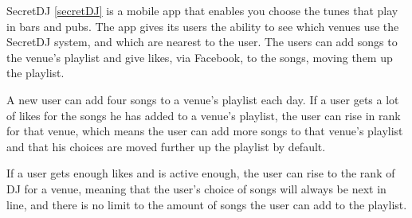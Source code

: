 SecretDJ \cref{secretDJ} is a mobile app that enables you choose the tunes that play in bars and pubs. The app gives its users the ability to see which venues use the SecretDJ system, and which are nearest to the user. The users can add songs to the venue's playlist and give likes, via Facebook, to the songs, moving them up the playlist.

A new user can add four songs to a venue's playlist each day. If a user gets a lot of likes for the songs he has added to a venue's playlist, the user can rise in rank for that venue, which means the user can add more songs to that venue's playlist and that his choices are moved further up the playlist by default.

If a user gets enough likes and is active enough, the user can rise to the rank of DJ for a venue, meaning that the user's choice of songs will always be next in line, and there is no limit to the amount of songs the user can add to the playlist.